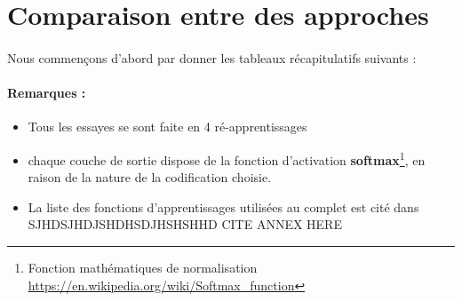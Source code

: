 \section{Comparaison entre des approches}
\paragraph{}Nous commençons d'abord par donner les tableaux récapitulatifs suivants :
\paragraph{Remarques : }
\begin{itemize}
	\item Tous les essayes se sont faite en 4 ré-apprentissages 
	\item chaque couche de sortie dispose de la fonction d'activation \textbf{softmax}\footnote{Fonction mathématiques de normalisation \url{https://en.wikipedia.org/wiki/Softmax_function}}, en raison de la nature de la codification choisie.
	\item La liste des fonctions d'apprentissages utilisées au complet est cité dans SJHDSJHDJSHDHSDJHSHSHHD CITE ANNEX HERE
\end{itemize}
\begin{table}[H]
	\centering
	\label{zeros}
	\caption{Meilleures architectures sur les données de teste pour l'approche naïve (\ref{naiveApproache}) avec partitionnement aléatoire(\ref{randomPartLearning})}
\end{table}
